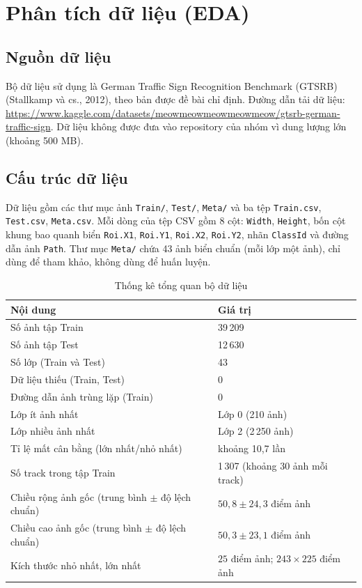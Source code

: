 \section{Phân tích dữ liệu (EDA)}

\subsection{Nguồn dữ liệu}

Bộ dữ liệu sử dụng là German Traffic Sign Recognition Benchmark (GTSRB) (Stallkamp và cs., 2012), theo bản được đề bài chỉ định. Đường dẫn tải dữ liệu: \url{https://www.kaggle.com/datasets/meowmeowmeowmeowmeow/gtsrb-german-traffic-sign}. Dữ liệu không được đưa vào repository của nhóm vì dung lượng lớn (khoảng 500 MB).

\subsection{Cấu trúc dữ liệu}

Dữ liệu gồm các thư mục ảnh \texttt{Train/}, \texttt{Test/}, \texttt{Meta/} và ba tệp \texttt{Train.csv}, \texttt{Test.csv}, \texttt{Meta.csv}. Mỗi dòng của tệp CSV gồm 8 cột: \texttt{Width}, \texttt{Height}, bốn cột khung bao quanh biển \texttt{Roi.X1}, \texttt{Roi.Y1}, \texttt{Roi.X2}, \texttt{Roi.Y2}, nhãn \texttt{ClassId} và đường dẫn ảnh \texttt{Path}. Thư mục \texttt{Meta/} chứa 43 ảnh biển chuẩn (mỗi lớp một ảnh), chỉ dùng để tham khảo, không dùng để huấn luyện.

\begin{table}[H]
\centering
\caption{Thống kê tổng quan bộ dữ liệu}
\label{tab:thong-ke-du-lieu}
\begin{tabular}{|p{7cm}|p{7.5cm}|}
\hline
\textbf{Nội dung} & \textbf{Giá trị} \\
\hline
Số ảnh tập Train & 39\,209 \\
\hline
Số ảnh tập Test & 12\,630 \\
\hline
Số lớp (Train và Test) & 43 \\
\hline
Dữ liệu thiếu (Train, Test) & 0 \\
\hline
Đường dẫn ảnh trùng lặp (Train) & 0 \\
\hline
Lớp ít ảnh nhất & Lớp 0 (210 ảnh) \\
\hline
Lớp nhiều ảnh nhất & Lớp 2 (2\,250 ảnh) \\
\hline
Tỉ lệ mất cân bằng (lớn nhất/nhỏ nhất) & khoảng 10,7 lần \\
\hline
Số track trong tập Train & 1\,307 (khoảng 30 ảnh mỗi track) \\
\hline
Chiều rộng ảnh gốc (trung bình $\pm$ độ lệch chuẩn) & $50{,}8 \pm 24{,}3$ điểm ảnh \\
\hline
Chiều cao ảnh gốc (trung bình $\pm$ độ lệch chuẩn) & $50{,}3 \pm 23{,}1$ điểm ảnh \\
\hline
Kích thước nhỏ nhất, lớn nhất & $25$ điểm ảnh; $243 \times 225$ điểm ảnh \\
\hline
\end{tabular}
\end{table}

